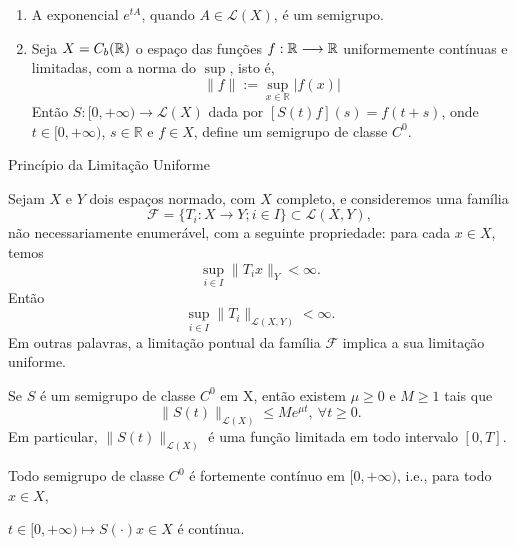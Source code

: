 \begin{frame}{}
    \begin{exe}
        \begin{enumerate}
            \item A exponencial $e^{tA}$, quando $A\in \mathcal{L}(X)$, é um semigrupo.
            \item Seja $X=C_b(\mathbb{R})$  o espaço das funções $f:\mathbb{R}\longrightarrow \mathbb{R}$ uniformemente contínuas e limitadas, com a norma do $\sup$, isto é,
            \[
            \displaystyle \|f\|:=\sup_{x\in \mathbb R} |f(x)|
            \]
            Então $S:[0,+\infty) \longrightarrow \mathcal L (X)$ dada por $[S(t)f](s)=f(t+s)$, onde $t\in [0,+\infty)$, $s\in \mathbb R$ e $f\in X$, define um semigrupo de classe $C^0$.
        \end{enumerate}
    \end{exe}

\end{frame}
\begin{frame}{Princípio da Limitação Uniforme}
\begin{teo}
Sejam $X$ e $Y$ dois espaços normado, com $X$ completo, e consideremos uma família
    \[
    \displaystyle \mathcal F =\{T_i :X\longrightarrow Y; i\in I\} \subset \mathcal L (X,Y),
    \]
    {\color{red} não necessariamente enumerável}, com a seguinte propriedade: para cada $x\in X$, temos
    \[
    \sup_{i\in I}\|T_ix\|_{Y} < \infty .
    \] 
    Então 
    \[
    \sup_{i\in I}\|T_i\|_{\mathcal{L}(X,Y)}<\infty.
    \]
    Em outras palavras, a limitação pontual da família $\mathcal F$ implica a sua limitação uniforme. 
    \end{teo}
\end{frame}
\begin{frame}{}
\begin{prop}
  Se $S$ é um semigrupo de classe $C^0$ em X, então existem $\mu\geq 0$ e $M\geq 1$ tais que 
    \begin{equation}\label{des.wT}
    \|S(t)\|_{\mathcal{L}(X)}\leq Me^{\mu t},\ \forall t\geq 0.  
    \end{equation}    
    Em particular, $\|S(t)\|_{\mathcal{L}(X)}$ é uma função limitada em todo intervalo $[0,T]$. 
\end{prop}
\begin{corol}
Todo semigrupo de classe $C^0$ é fortemente contínuo em $[0,+\infty)$, i.e., 
para todo $x\in X$, 
\begin{center}
$t\in [0,+\infty)\longmapsto S(\cdot)x\in  X$ é contínua.
\end{center}
\end{corol}
\end{frame}

